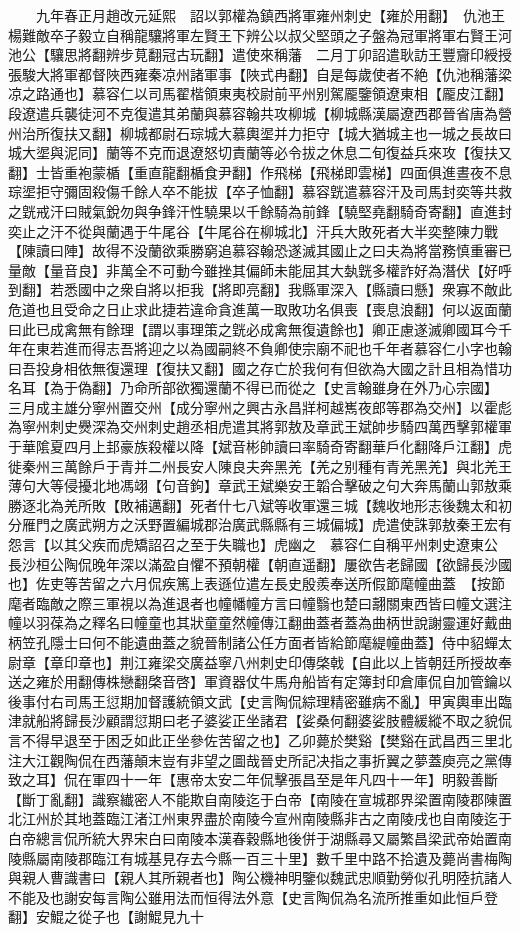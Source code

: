 　　九年春正月趙改元延熙　詔以郭權為鎮西將軍雍州刺史【雍於用翻】　仇池王楊難敵卒子毅立自稱龍驤將軍左賢王下辨公以叔父堅頭之子盤為冠軍將軍右賢王河池公【驤思將翻辨步莧翻冠古玩翻】遣使來稱藩　二月丁卯詔遣耿訪王豐齎印綬授張駿大將軍都督陜西雍秦凉州諸軍事【陜式冉翻】自是每歲使者不絶【仇池稱藩梁凉之路通也】慕容仁以司馬翟楷領東夷校尉前平州别駕龎鑒領遼東相【龎皮江翻】　段遼遣兵襲徒河不克復遣其弟蘭與慕容翰共攻柳城【柳城縣漢屬遼西郡晉省唐為營州治所復扶又翻】柳城都尉石琮城大慕輿埿并力拒守【城大猶城主也一城之長故曰城大埿與泥同】蘭等不克而退遼怒切責蘭等必令拔之休息二旬復益兵來攻【復扶又翻】士皆重袍蒙楯【重直龍翻楯食尹翻】作飛梯【飛梯即雲梯】四面俱進晝夜不息琮埿拒守彌固殺傷千餘人卒不能拔【卒子恤翻】慕容皝遣慕容汗及司馬封奕等共救之皝戒汗曰賊氣銳勿與争鋒汗性驍果以千餘騎為前鋒【驍堅堯翻騎奇寄翻】直進封奕止之汗不從與蘭遇于牛尾谷【牛尾谷在柳城北】汗兵大敗死者大半奕整陳力戰【陳讀曰陣】故得不没蘭欲乘勝窮追慕容翰恐遂滅其國止之曰夫為將當務慎重審已量敵【量音良】非萬全不可動今雖挫其偏師未能屈其大埶皝多權詐好為潛伏【好呼到翻】若悉國中之衆自將以拒我【將即亮翻】我縣軍深入【縣讀曰懸】衆寡不敵此危道也且受命之日止求此捷若違命貪進萬一取敗功名俱喪【喪息浪翻】何以返面蘭曰此已成禽無有餘理【謂以事理策之皝必成禽無復遺餘也】卿正慮遂滅卿國耳今千年在東若進而得志吾將迎之以為國嗣終不負卿使宗廟不祀也千年者慕容仁小字也翰曰吾投身相依無復還理【復扶又翻】國之存亡於我何有但欲為大國之計且相為惜功名耳【為于偽翻】乃命所部欲獨還蘭不得已而從之【史言翰雖身在外乃心宗國】　三月成主雄分寧州置交州【成分寧州之興古永昌牂柯越嶲夜郎等郡為交州】以霍彪為寧州刺史㸑深為交州刺史趙丞相虎遣其將郭敖及章武王斌帥步騎四萬西擊郭權軍于華隂夏四月上邽豪族殺權以降【斌音彬帥讀曰率騎奇寄翻華戶化翻降戶江翻】虎徙秦州三萬餘戶于青并二州長安人陳良夫奔黑羌【羌之别種有青羌黑羌】與北羌王薄句大等侵擾北地馮翊【句音鉤】章武王斌樂安王韜合擊破之句大奔馬蘭山郭敖乘勝逐北為羌所敗【敗補邁翻】死者什七八斌等收軍還三城【魏收地形志後魏太和初分雁門之廣武朔方之沃野置編城郡治廣武縣縣有三城偏城】虎遣使誅郭敖秦王宏有怨言【以其父疾而虎矯詔召之至于失職也】虎幽之　慕容仁自稱平州刺史遼東公　長沙桓公陶侃晚年深以滿盈自懼不預朝權【朝直遥翻】屢欲告老歸國【欲歸長沙國也】佐吏等苦留之六月侃疾篤上表遜位遣左長史殷羨奉送所假節麾幢曲蓋　【按節麾者臨敵之際三軍視以為進退者也幢幡幢方言曰幢翳也楚曰翿關東西皆曰幢文選注幢以羽葆為之釋名曰幢童也其狀童童然幢傳江翻曲蓋者蓋為曲柄世說謝靈運好戴曲柄笠孔隱士曰何不能遺曲蓋之貌晉制諸公任方面者皆給節麾緹幢曲蓋】侍中貂蟬太尉章【章印章也】荆江雍梁交廣益寧八州刺史印傳棨戟【自此以上皆朝廷所授故奉送之雍於用翻傳株戀翻棨音啓】軍資器仗牛馬舟船皆有定簿封印倉庫侃自加管鑰以後事付右司馬王愆期加督護統領文武【史言陶侃綜理精密雖病不亂】甲寅輿車出臨津就船將歸長沙顧謂愆期曰老子婆娑正坐諸君【娑桑何翻婆娑肢體緩縱不取之貌侃言不得早退至于困乏如此正坐參佐苦留之也】乙卯薨於樊谿【樊谿在武昌西三里北注大江觀陶侃在西藩顛末豈有非望之圖哉晉史所記决指之事折翼之夢蓋庾亮之黨傳致之耳】侃在軍四十一年【惠帝太安二年侃擊張昌至是年凡四十一年】明毅善斷【斷丁亂翻】識察纎密人不能欺自南陵迄于白帝【南陵在宣城郡界梁置南陵郡陳置北江州於其地蓋臨江渚江州東界盡於南陵今宣州南陵縣非古之南陵戌也自南陵迄于白帝總言侃所統大界宋白曰南陵本漢春穀縣地後併于湖縣尋又屬繁昌梁武帝始置南陵縣屬南陵郡臨江有城基見存去今縣一百三十里】數千里中路不拾遺及薨尚書梅陶與親人曹識書曰【親人其所親者也】陶公機神明鑒似魏武忠順勤勞似孔明陸抗諸人不能及也謝安每言陶公雖用法而恒得法外意【史言陶侃為名流所推重如此恒戶登翻】安鯤之從子也【謝鯤見九十
